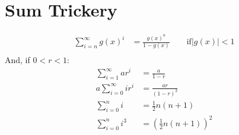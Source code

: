 \section{Sum Trickery}
\begin{equation*}
    \begin{aligned}
        \sum_{i=n}^{\infty} g(x)^i &= \frac{g(x)^n}{1 - g(x)} \qquad \text{if}
        |g(x)| < 1 \\
    \end{aligned}
\end{equation*}
And, if $0 < r < 1$:
\begin{equation*}
    \begin{aligned}
        \sum_{i=1}^\infty a r^i &= \frac{a}{1 - r} \\
        a \sum_{i=0}^{\infty} ir^i &= \frac{ar}{(1-r)^2}\\
        \sum_{i=0}^n i &= \frac{1}{2} n(n+1)\\
        \sum_{i=0}^{n} i^3 &= \left(  \frac{1}{2} n (n+1)\right)^2 \\
    \end{aligned}
\end{equation*}


